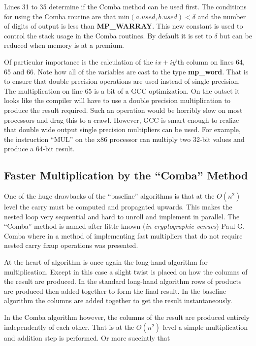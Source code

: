 \documentclass[b5paper]{book}
\begin{document}
Lines 31 to 35 determine if the Comba method can be used first.  The conditions for using the Comba routine are that min$(a.used, b.used) < \delta$ and
the number of digits of output is less than \textbf{MP\_WARRAY}.  This new constant is used to control the stack usage in the Comba routines.  By
default it is set to $\delta$ but can be reduced when memory is at a premium.

Of particular importance is the calculation of the $ix+iy$'th column on lines 64, 65 and 66.  Note how all of the
variables are cast to the type \textbf{mp\_word}.  That is to ensure that double precision operations are used instead of single precision.  The
multiplication on line 65 is a bit of a GCC optimization.  On the outset it looks like the compiler will have to use a double precision
multiplication to produce the result required.  Such an operation would be horribly slow on most processors and drag this to a crawl.  However,
GCC is smart enough to realize that double wide output single precision multipliers can be used.  For example, the instruction ``MUL'' on the
x86 processor can multiply two 32-bit values and produce a 64-bit result.  

\subsection{Faster Multiplication by the ``Comba'' Method}

One of the huge drawbacks of the ``baseline'' algorithms is that at the $O(n^2)$ level the carry must be computed and propagated upwards.  This
makes the nested loop very sequential and hard to unroll and implement in parallel.  The ``Comba'' method is named after little known 
(\textit{in cryptographic venues}) Paul G. Comba where in \cite{COMBA} a method of implementing fast multipliers that do not require nested 
carry fixup operations was presented.

At the heart of algorithm is once again the long-hand algorithm for multiplication.  Except in this case a slight twist is placed on how
the columns of the result are produced.  In the standard long-hand algorithm rows of products are produced then added together to form the 
final result.  In the baseline algorithm the columns are added together to get the result instantaneously.  

In the Comba algorithm however, the columns of the result are produced entirely independently of each other.  That is at the $O(n^2)$ level a 
simple multiplication and addition step is performed.  Or more succintly that 
\end{document}

